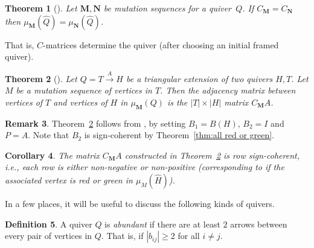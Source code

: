 \documentclass[11pt, letterpaper]{amsart}
\newcommand{\cS}[1]{{\noindent\textsf{\color{purple}$\blacksquare$~#1~$\blacksquare$}}}
\newcommand{\hide}[1]{}
\newtheorem{theorem}{Theorem}[section]
\newtheorem{corollary}[theorem]{Corollary}
\theoremstyle{definition}
\newtheorem{remark}[theorem]{Remark}
\newtheorem{definition}[theorem]{Definition}
\numberwithin{equation}{section}
\begin{document}
\begin{theorem}[\cite{MR4092846}] %
\label{thm:C matrices determine}
Let ${\mathbf{M}}, {\mathbf{N}}$ be mutation sequences for a quiver~$Q$.
If $C_{\mathbf{M}} = C_{\mathbf{N}}$ then $\mu_{\mathbf{M}}(\widehat Q) = \mu_{\mathbf{N}}(\widehat Q)$.
\end{theorem}

That is, $C$-matrices determine the quiver (after choosing an initial framed quiver).

\begin{theorem}[{\cite[Lemma 3.1, Theorem 3.2]{MR4029226}}] %
\label{thm:extensions linear comb of framing}
Let $Q = T \stackrel{A}{\rightarrow} H$ be a triangular extension of two quivers $H,T$.
Let $M$ be a mutation sequence of vertices in $T$.
Then the adjacency matrix between vertices of $T$ and vertices of $H$ in $\mu_{\textbf{M}}(Q)$ is the $|T| \times |H|$ matrix $C_{\textbf{M}}A$. 
\end{theorem}

\begin{remark}
Theorem~\ref{thm:extensions linear comb of framing} follows from \cite[Lemma 3.1, Theorem 3.2]{MR4029226}, by setting ${B_1 = B(H)}$, $B_2 = I$ and $P=A$. Note that $B_2$ is sign-coherent by Theorem~\ref{thm:all red or green}.
\end{remark}

\begin{corollary}
\label{cor:oris follow}
The matrix $C_{\textbf{M}}A$ constructed in Theorem~\ref{thm:extensions linear comb of framing} is row sign-coherent, i.e., each row is either non-negative or non-positive (corresponding to if the associated vertex is red or green in $\mu_M(\widehat H)$).
\end{corollary}

\hide{
\begin{theorem}[\cite{MR2629987}]
\label{thm:sign coherence of G}
Let $G = C^{-T}$ for a $C$-matrix $C$. \cS{Standardize notation; probably add subscripts for mutation seqs and Q.}
Then the columns of $G$ are sign-coherent.
\end{theorem}
}


In a few places, it will be useful to discuss the following kinds of quivers.

\begin{definition}
\label{def:abundant}
A quiver $Q$ is \emph{abundant} if there are at least $2$ arrows between every pair of vertices in $Q$. That is, if $|b_{ij}| \geq 2$ for all $i\neq j$.
\end{definition}
\end{document}
